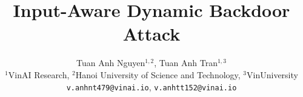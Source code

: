 \newcommand{\truefalse}{
\begin{enumerate}
	\item True
	\item False
\end{enumerate}
}

\newcommand{\yesno}{
\begin{enumerate}
	\item Yes
	\item No
\end{enumerate}
}
\newcommand{\Sref}[1]{Sec.~\ref{#1}}
\newcommand{\Eref}[1]{Eq.~(\ref{#1})}
\newcommand{\Fref}[1]{Fig.~\ref{#1}}
\newcommand{\Tref}[1]{Tab.~\ref{#1}}

\newcommand{\ta}[1]{\textcolor{green}{{#1}}}
\newcommand{\todo}[1]{\textcolor{blue}{[{#1}]}}


 
\documentclass{article}

\usepackage[preprint]{neurips_2020}
\usepackage[utf8]{inputenc} %
\usepackage[T1]{fontenc}    %
\usepackage{hyperref}       %
\usepackage{url}            %
\usepackage{booktabs}       %
\usepackage{amsfonts}       %
\usepackage{nicefrac}       %
\usepackage{microtype}      %
\usepackage{amsmath}
\usepackage{graphicx}
\usepackage{nicefrac}
\usepackage{color}
\usepackage{amsthm}
\usepackage{tabu}
\usepackage{subfig}
\usepackage{multirow}
\usepackage[linesnumbered,ruled,vlined]{algorithm2e}
\newcommand{\minisection}[1]{\vspace{2mm}\noindent{\textbf{#1}.}}
\newtheorem{theorem}{Theorem}
\newtheorem{definition}{Definition}

\title{Input-Aware Dynamic Backdoor Attack}

\author{
  Tuan Anh Nguyen$^{1,2}$, Tuan Anh Tran$^{1,3}$ \\
  $^1$VinAI Research, $^2$Hanoi University of Science and Technology, $^3$VinUniversity \\
  \texttt{v.anhnt479@vinai.io},  \texttt{v.anhtt152@vinai.io} \\
}



\maketitle


